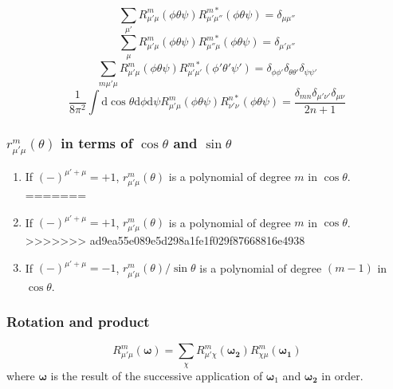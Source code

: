 \begin{equation}
\sum_{\mu'}R_{\mu'\mu}^{m}(\phi\theta\psi)R_{\mu'\mu''}^{m*}(\phi\theta\psi)=\delta_{\mu\mu''}
\end{equation}
\begin{equation}
\sum_{\mu}R_{\mu'\mu}^{m}(\phi\theta\psi)R_{\mu''\mu}^{m*}(\phi\theta\psi)=\delta_{\mu'\mu''}
\end{equation}
\begin{equation}
\sum_{m\mu'\mu}R_{\mu'\mu}^{m}(\phi\theta\psi)R_{\mu'\mu'}^{m*}(\phi'\theta'\psi')=\delta_{\phi\phi'}\delta_{\theta\theta'}\delta_{\psi\psi'}
\end{equation}
\begin{equation}
\frac{1}{8\pi^{2}}\int\mathrm{d}\cos\theta\mathrm{d}\phi\mathrm{d}\psi R_{\mu'\mu}^{m}(\phi\theta\psi)R_{\nu'\nu}^{n*}(\phi\theta\psi)=\frac{\delta_{mn}\delta_{\mu'\nu'}\delta_{\mu\nu}}{2n+1}\label{eq:gsh-orthogonality}
\end{equation}



\subsubsection*{$r_{\mu'\mu}^{m}(\theta)$ in terms of $\cos\theta$ and $\sin\theta$}
\begin{enumerate}
<<<<<<< HEAD
\item If $\left(-\right)^{\mu'+\mu}=+1$, $r_{\mu'\mu}^{m}(\theta)$ is
a polynomial of degree $m$ in $\cos\theta$.
=======
\item If $\left(-\right)^{\mu'+\mu}=+1$, $r_{\mu'\mu}^{m}(\theta)$ is a
polynomial of degree $m$ in $\cos\theta$.
>>>>>>> ad9ea55e089e5d298a1fe1f029f87668816e4938
\item If $\left(-\right)^{\mu'+\mu}=-1$, $r_{\mu'\mu}^{m}(\theta)/\sin\theta$
is a polynomial of degree $(m-1)$ in $\cos\theta$.
\end{enumerate}

\subsubsection*{Rotation and product}

\begin{equation}
R_{\mu'\mu}^{m}(\boldsymbol{\omega})=\sum_{\chi}R_{\mu'\chi}^{m}(\boldsymbol{\omega_{2}})R_{\chi\mu}^{m}(\boldsymbol{\omega_{1}})
\end{equation}
where $\boldsymbol{\omega}$ is the result of the successive application
of $\boldsymbol{\omega}_{1}$ and $\boldsymbol{\omega_{2}}$ in order.

